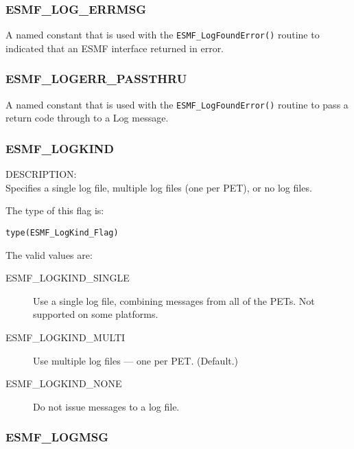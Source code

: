 

\subsubsection{ESMF\_LOG\_ERRMSG}

A named constant that is used with the
{\tt ESMF\_LogFoundError()} routine to indicated that an
ESMF interface returned in error.

\subsubsection{ESMF\_LOGERR\_PASSTHRU}

A named constant that is used with the
{\tt ESMF\_LogFoundError()} routine to pass a return code through
to a Log message.

\subsubsection{ESMF\_LOGKIND}
\label{const:logkindflag}

{\sf DESCRIPTION:\\}
Specifies a single log file, multiple log files (one per PET), or no log files.

The type of this flag is:

{\tt type(ESMF\_LogKind\_Flag)}

The valid values are:
\begin{description}
   \item [ESMF\_LOGKIND\_SINGLE] 
         Use a single log file, combining messages from all of the PETs.  Not supported on some platforms.
   \item [ESMF\_LOGKIND\_MULTI]
         Use multiple log files --- one per PET.  (Default.)
   \item [ESMF\_LOGKIND\_NONE]
         Do not issue messages to a log file.
\end{description}

\subsubsection{ESMF\_LOGMSG}
\label{const:logmsgflag}

